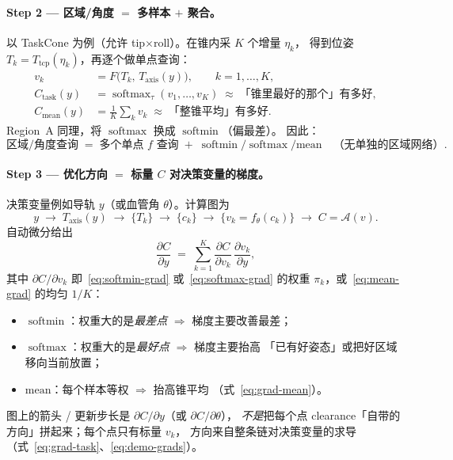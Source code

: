 \documentclass[UTF8,a4paper,11pt,fontset=fandol]{ctexart}
\newcommand{\Tcp}{T_{\mathrm{tcp}}}
\newcommand{\Taxis}{T_{\mathrm{axis}}}
\newcommand{\softmin}{\operatorname{softmin}}
\newcommand{\softmax}{\operatorname{softmax}}
\begin{document}
\paragraph{Step 2 --- 区域/角度 $=$ 多样本 $+$ 聚合。}
以 TaskCone 为例（允许 tip$\times$roll）。在锥内采 \(K\) 个增量 \(\eta_{k}\)，
得到位姿 \(T_{k}=\Tcp(\eta_{k})\)，再逐个做单点查询：
\begin{equation}
\label{eq:task-pipe}
\begin{aligned}
  v_{k}
  &=
  F\bigl(T_{k},\,\Taxis(y)\bigr),
  \qquad
  k=1,\ldots,K,
  \\
  C_{\mathrm{task}}(y)
  &=
  \softmax_{\tau}(v_{1},\ldots,v_{K})
  \;\approx\;
  \text{「锥里最好的那个」有多好},
  \\
  C_{\mathrm{mean}}(y)
  &=
  \tfrac{1}{K}\sum_{k} v_{k}
  \;\approx\;
  \text{「整锥平均」有多好}.
\end{aligned}
\end{equation}
Region~A 同理，将 \(\softmax\) 换成 \(\softmin\)（偏最差）。
因此：
\[
  \text{区域/角度查询}
  \;=\;
  \text{多个单点 }f\text{ 查询}
  \;+\;
  \softmin/\softmax/\mathrm{mean}
  \quad\text{（无单独的区域网络）}.
\]

\paragraph{Step 3 --- 优化方向 $=$ 标量 $C$ 对决策变量的梯度。}
决策变量例如导轨 \(y\)（或血管角 \(\theta\)）。计算图为
\begin{equation}
\label{eq:opt-chain}
  y
  \;\to\;
  \Taxis(y)
  \;\to\;
  \{T_{k}\}
  \;\to\;
  \{c_{k}\}
  \;\to\;
  \{v_{k}=f_{\theta}(c_{k})\}
  \;\to\;
  C=\mathcal{A}(v).
\end{equation}
自动微分给出
\begin{equation}
\label{eq:opt-grad-y}
  \frac{\partial C}{\partial y}
  \;=\;
  \sum_{k=1}^{K}
  \frac{\partial C}{\partial v_{k}}\,
  \frac{\partial v_{k}}{\partial y},
\end{equation}
其中 \(\partial C/\partial v_{k}\) 即~\eqref{eq:softmin-grad} 或~\eqref{eq:softmax-grad}
的权重 \(\pi_{k}\)，或~\eqref{eq:mean-grad} 的均匀 \(1/K\)：
\begin{itemize}[leftmargin=1.4em]
  \item \(\softmin\)：权重大的是\emph{最差点} \(\Rightarrow\) 梯度主要改善最差；
  \item \(\softmax\)：权重大的是\emph{最好点} \(\Rightarrow\) 梯度主要抬高
        「已有好姿态」或把好区域移向当前放置；
  \item \(\mathrm{mean}\)：每个样本等权 \(\Rightarrow\) 抬高锥平均
        （式~\eqref{eq:grad-mean}）。
\end{itemize}
图上的箭头 / 更新步长是 \(\partial C/\partial y\)（或 \(\partial C/\partial\theta\)），
\emph{不是}把每个点 clearance「自带的方向」拼起来；每个点只有标量 \(v_{k}\)，
方向来自整条链对决策变量的求导（式~\eqref{eq:grad-task}、\eqref{eq:demo-grads}）。
\end{document}
